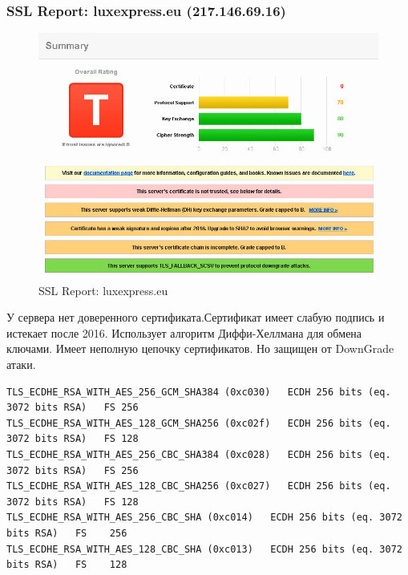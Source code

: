 \documentclass[12pt,a4paper]{article}
\begin{document}
\subsubsection{SSL Report: luxexpress.eu (217.146.69.16)}
\begin{figure}[h!]
\centering
\includegraphics[scale=0.5]{1}
\caption{SSL Report: luxexpress.eu}
\end{figure}
У сервера нет доверенного сертификата.Сертификат имеет слабую подпись и истекает после 2016. Использует алгоритм Диффи-Хеллмана для обмена ключами. Имеет неполную цепочку сертификатов. Но защищен от DownGrade атаки.
\small
\begin{lstlisting}
TLS_ECDHE_RSA_WITH_AES_256_GCM_SHA384 (0xc030)   ECDH 256 bits (eq. 3072 bits RSA)   FS	256
TLS_ECDHE_RSA_WITH_AES_128_GCM_SHA256 (0xc02f)   ECDH 256 bits (eq. 3072 bits RSA)   FS	128
TLS_ECDHE_RSA_WITH_AES_256_CBC_SHA384 (0xc028)   ECDH 256 bits (eq. 3072 bits RSA)   FS	256
TLS_ECDHE_RSA_WITH_AES_128_CBC_SHA256 (0xc027)   ECDH 256 bits (eq. 3072 bits RSA)   FS	128
TLS_ECDHE_RSA_WITH_AES_256_CBC_SHA (0xc014)   ECDH 256 bits (eq. 3072 bits RSA)   FS	256
TLS_ECDHE_RSA_WITH_AES_128_CBC_SHA (0xc013)   ECDH 256 bits (eq. 3072 bits RSA)   FS	128
\end{lstlisting}
\end{document}
